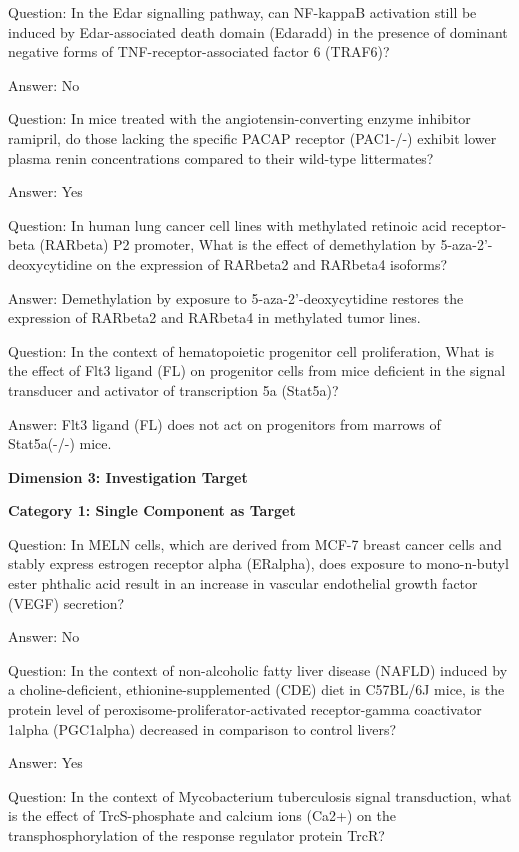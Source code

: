 Question: In the Edar signalling pathway, can NF-kappaB activation still be induced by Edar-associated death domain (Edaradd) in the presence of dominant negative forms of TNF-receptor-associated factor 6 (TRAF6)?

Answer: No

Question: In mice treated with the angiotensin-converting enzyme inhibitor ramipril, do those lacking the specific PACAP receptor (PAC1-/-) exhibit lower plasma renin concentrations compared to their wild-type littermates?

Answer: Yes


Question: In human lung cancer cell lines with methylated retinoic acid receptor-beta (RARbeta) P2 promoter, What is the effect of demethylation by 5-aza-2'-deoxycytidine on the expression of RARbeta2 and RARbeta4 isoforms?

Answer: Demethylation by exposure to 5-aza-2'-deoxycytidine restores the expression of RARbeta2 and RARbeta4 in methylated tumor lines.

Question: In the context of hematopoietic progenitor cell proliferation, What is the effect of Flt3 ligand (FL) on progenitor cells from mice deficient in the signal transducer and activator of transcription 5a (Stat5a)?

Answer: Flt3 ligand (FL) does not act on progenitors from marrows of Stat5a(-/-) mice.

\textbf{Dimension 3: Investigation Target}

\textbf{Category 1: Single Component as Target} 

Question: In MELN cells, which are derived from MCF-7 breast cancer cells and stably express estrogen receptor alpha (ERalpha), does exposure to mono-n-butyl ester phthalic acid result in an increase in vascular endothelial growth factor (VEGF) secretion?

Answer: No

Question: In the context of non-alcoholic fatty liver disease (NAFLD) induced by a choline-deficient, ethionine-supplemented (CDE) diet in C57BL/6J mice, is the protein level of peroxisome-proliferator-activated receptor-gamma coactivator 1alpha (PGC1alpha) decreased in comparison to control livers?

Answer: Yes

Question: In the context of Mycobacterium tuberculosis signal transduction, what is the effect of TrcS-phosphate and calcium ions (Ca2+) on the transphosphorylation of the response regulator protein TrcR?

